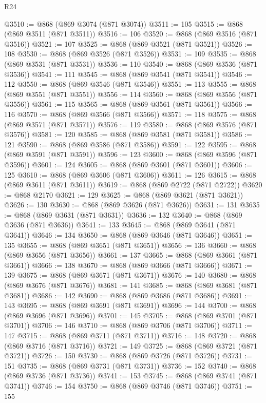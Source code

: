 \begin{lexlean}{R24}
\begin{coremodule}
@3510 := @868 (@869 @3074 (@871 @3074))
@3511 := 105
@3515 := @868 (@869 @3511 (@871 @3511))
@3516 := 106
@3520 := @868 (@869 @3516 (@871 @3516))
@3521 := 107
@3525 := @868 (@869 @3521 (@871 @3521))
@3526 := 108
@3530 := @868 (@869 @3526 (@871 @3526))
@3531 := 109
@3535 := @868 (@869 @3531 (@871 @3531))
@3536 := 110
@3540 := @868 (@869 @3536 (@871 @3536))
@3541 := 111
@3545 := @868 (@869 @3541 (@871 @3541))
@3546 := 112
@3550 := @868 (@869 @3546 (@871 @3546))
@3551 := 113
@3555 := @868 (@869 @3551 (@871 @3551))
@3556 := 114
@3560 := @868 (@869 @3556 (@871 @3556))
@3561 := 115
@3565 := @868 (@869 @3561 (@871 @3561))
@3566 := 116
@3570 := @868 (@869 @3566 (@871 @3566))
@3571 := 118
@3575 := @868 (@869 @3571 (@871 @3571))
@3576 := 119
@3580 := @868 (@869 @3576 (@871 @3576))
@3581 := 120
@3585 := @868 (@869 @3581 (@871 @3581))
@3586 := 121
@3590 := @868 (@869 @3586 (@871 @3586))
@3591 := 122
@3595 := @868 (@869 @3591 (@871 @3591))
@3596 := 123
@3600 := @868 (@869 @3596 (@871 @3596))
@3601 := 124
@3605 := @868 (@869 @3601 (@871 @3601))
@3606 := 125
@3610 := @868 (@869 @3606 (@871 @3606))
@3611 := 126
@3615 := @868 (@869 @3611 (@871 @3611))
@3619 := @868 (@869 @2722 (@871 @2722))
@3620 := @868 @2170
@3621 := 129
@3625 := @868 (@869 @3621 (@871 @3621))
@3626 := 130
@3630 := @868 (@869 @3626 (@871 @3626))
@3631 := 131
@3635 := @868 (@869 @3631 (@871 @3631))
@3636 := 132
@3640 := @868 (@869 @3636 (@871 @3636))
@3641 := 133
@3645 := @868 (@869 @3641 (@871 @3641))
@3646 := 134
@3650 := @868 (@869 @3646 (@871 @3646))
@3651 := 135
@3655 := @868 (@869 @3651 (@871 @3651))
@3656 := 136
@3660 := @868 (@869 @3656 (@871 @3656))
@3661 := 137
@3665 := @868 (@869 @3661 (@871 @3661))
@3666 := 138
@3670 := @868 (@869 @3666 (@871 @3666))
@3671 := 139
@3675 := @868 (@869 @3671 (@871 @3671))
@3676 := 140
@3680 := @868 (@869 @3676 (@871 @3676))
@3681 := 141
@3685 := @868 (@869 @3681 (@871 @3681))
@3686 := 142
@3690 := @868 (@869 @3686 (@871 @3686))
@3691 := 143
@3695 := @868 (@869 @3691 (@871 @3691))
@3696 := 144
@3700 := @868 (@869 @3696 (@871 @3696))
@3701 := 145
@3705 := @868 (@869 @3701 (@871 @3701))
@3706 := 146
@3710 := @868 (@869 @3706 (@871 @3706))
@3711 := 147
@3715 := @868 (@869 @3711 (@871 @3711))
@3716 := 148
@3720 := @868 (@869 @3716 (@871 @3716))
@3721 := 149
@3725 := @868 (@869 @3721 (@871 @3721))
@3726 := 150
@3730 := @868 (@869 @3726 (@871 @3726))
@3731 := 151
@3735 := @868 (@869 @3731 (@871 @3731))
@3736 := 152
@3740 := @868 (@869 @3736 (@871 @3736))
@3741 := 153
@3745 := @868 (@869 @3741 (@871 @3741))
@3746 := 154
@3750 := @868 (@869 @3746 (@871 @3746))
@3751 := 155

\end{coremodule}
\end{lexlean}
